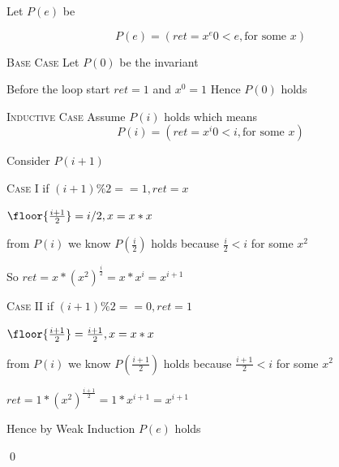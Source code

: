 
Let $P(e)$ be

\[
P(e) = (ret = x^e  0 < e, \text{for some } x)
\]

\textsc{Base Case} Let $P(0)$ be the invariant

Before the loop start $ret = 1$ and $x^0 = 1$ Hence $P(0)$ holds

\textsc{Inductive Case} Assume $P(i)$ holds which means
\[
P(i) = (ret = x^i  0 < i, \text{for some } x)
\]

Consider $P(i+1)$

\textsc{Case I}
if $(i+1) \% 2 == 1, ret = x$

$\floor{\frac{i+1}{2}} = i/2, x = x * x$

from $P(i)$ we know $P(\frac{i}{2})$ holds because $\frac{i}{2} < i$ for some $x^2$

So $ret =  x * (x^2)^{\frac{i}{2}} = x * x^i = x^{i+1}$

\textsc{Case II}
if $(i+1) \% 2 == 0, ret = 1$

$\floor{\frac{i+1}{2}} = \frac{i+1}{2}, x = x * x$

from $P(i)$ we know $P(\frac{i+1}{2})$ holds because $\frac{i+1}{2} < i$ for some $x^2$

$ret = 1 * (x^2)^{\frac{i+1}{2}} = 1 * x^{i+1} = x^{i+1}$

Hence by Weak Induction $P(e)$ holds

\qed

